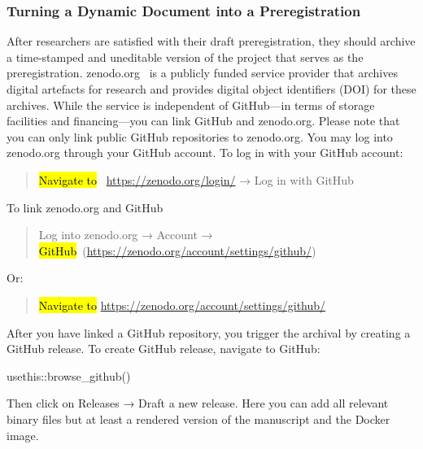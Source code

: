 \documentclass[psych,tutorial,accept,moreauthors,pdftex]{Definitions/mdpi}
\newenvironment{Shaded}{\begin{snugshade}}{\end{snugshade}}
\newcommand{\FunctionTok}[1]{\textcolor[rgb]{0.00,0.00,0.00}{#1}}
\newcommand{\NormalTok}[1]{#1}
\newcommand{\SpecialCharTok}[1]{\textcolor[rgb]{0.00,0.00,0.00}{#1}}
\begin{document}
\begin{paracol}{2}
\subsubsection*{Turning a Dynamic Document into a
Preregistration}\label{turning-a-dynamic-document-into-a-preregistration}

After researchers are satisfied with their draft preregistration, they
should archive a time-stamped and uneditable version of the project that
serves as the preregistration. zenodo.org~\citep{zenodo} is a publicly
funded service provider that archives digital artefacts for research and
provides digital object identifiers (DOI) for these archives. While the
service is independent of GitHub---in terms of storage facilities and
financing---you can link GitHub and zenodo.org. Please note that you can
only link public GitHub repositories to zenodo.org. You may log into
zenodo.org through your GitHub account. To log in with your GitHub
account:

\begin{quote}
\hl{Navigate to}
~\url{https://zenodo.org/login/} → Log in with GitHub
\end{quote}

\noindent{}To link zenodo.org and GitHub

\begin{quote}
Log into zenodo.org → Account → \hl{GitHub}~({\url{https://zenodo.org/account/settings/github/}})
\end{quote}

\noindent{}Or:

\begin{quote}
\hl{Navigate to}
 \url{https://zenodo.org/account/settings/github/}
\end{quote}

After you have linked a GitHub repository, you trigger the archival by
creating a GitHub release. To create GitHub release, navigate to GitHub:

\begin{adjustwidth}{0.5cm}{0cm} 
\begin{Shaded}
\begin{Highlighting}[]
\NormalTok{usethis}\SpecialCharTok{::}\FunctionTok{browse\_github}\NormalTok{()}
\end{Highlighting}
\end{Shaded}
\end{adjustwidth}

Then click on Releases → Draft a new release. Here you can add all
relevant binary files but at least a rendered version of the manuscript
and the Docker image.


\end{paracol}
\end{document}
